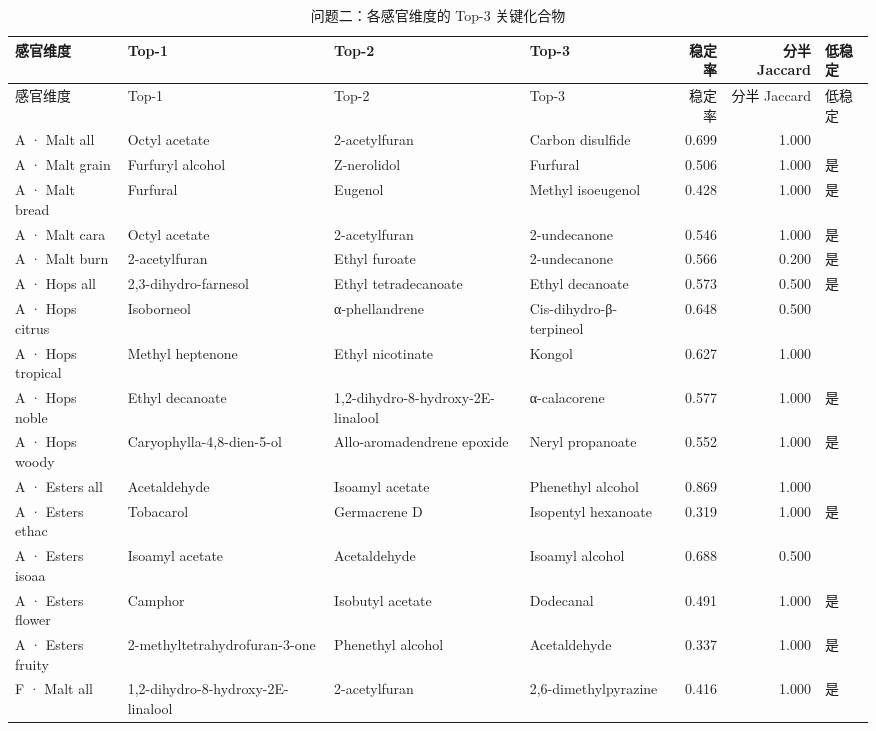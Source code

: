 {\footnotesize
\setlength{\tabcolsep}{3.5pt}
\begin{longtable}{llllrrl}
\caption{问题二：各感官维度的 Top-3 关键化合物}
\label{tab:t07_q2_top3}\\
\toprule
感官维度 & Top-1 & Top-2 & Top-3 & 稳定率 & 分半 Jaccard & 低稳定 \\
\midrule
\endfirsthead
\toprule
感官维度 & Top-1 & Top-2 & Top-3 & 稳定率 & 分半 Jaccard & 低稳定 \\
\midrule
\endhead
\bottomrule
\endlastfoot
A · Malt all & Octyl acetate & 2-acetylfuran & Carbon disulfide & 0.699 & 1.000 &  \\
A · Malt grain & Furfuryl alcohol & Z-nerolidol & Furfural & 0.506 & 1.000 & 是 \\
A · Malt bread & Furfural & Eugenol & Methyl isoeugenol & 0.428 & 1.000 & 是 \\
A · Malt cara & Octyl acetate & 2-acetylfuran & 2-undecanone & 0.546 & 1.000 & 是 \\
A · Malt burn & 2-acetylfuran & Ethyl furoate & 2-undecanone & 0.566 & 0.200 & 是 \\
A · Hops all & 2,3-dihydro-farnesol & Ethyl tetradecanoate & Ethyl decanoate & 0.573 & 0.500 & 是 \\
A · Hops citrus & Isoborneol & α-phellandrene & Cis-dihydro-β-terpineol & 0.648 & 0.500 &  \\
A · Hops tropical & Methyl heptenone & Ethyl nicotinate & Kongol & 0.627 & 1.000 &  \\
A · Hops noble & Ethyl decanoate & 1,2-dihydro-8-hydroxy-2E-linalool & α-calacorene & 0.577 & 1.000 & 是 \\
A · Hops woody & Caryophylla-4,8-dien-5-ol & Allo-aromadendrene epoxide & Neryl propanoate & 0.552 & 1.000 & 是 \\
A · Esters all & Acetaldehyde & Isoamyl acetate & Phenethyl alcohol & 0.869 & 1.000 &  \\
A · Esters ethac & Tobacarol & Germacrene D & Isopentyl hexanoate & 0.319 & 1.000 & 是 \\
A · Esters isoaa & Isoamyl acetate & Acetaldehyde & Isoamyl alcohol & 0.688 & 0.500 &  \\
A · Esters flower & Camphor & Isobutyl acetate & Dodecanal & 0.491 & 1.000 & 是 \\
A · Esters fruity & 2-methyltetrahydrofuran-3-one & Phenethyl alcohol & Acetaldehyde & 0.337 & 1.000 & 是 \\
F · Malt all & 1,2-dihydro-8-hydroxy-2E-linalool & 2-acetylfuran & 2,6-dimethylpyrazine & 0.416 & 1.000 & 是 \\

\end{longtable}}
